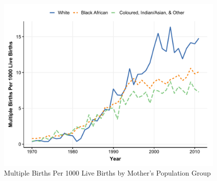 
\begin{figure}[!th]
\centering
\caption{\label{fig:line-pp}Multiple Births Per 1000 Live Births by Mother's Population Group}
\includegraphics[width=\textwidth]{figures/line_pp.pdf}
\end{figure}
\pagebreak



 
\pagebreak

